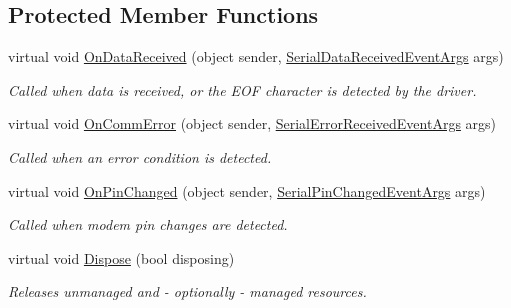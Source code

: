 \subsection*{Protected Member Functions}
\begin{DoxyCompactItemize}
\item 
virtual void \mbox{\hyperlink{class_r_j_c_p_1_1_i_o_1_1_ports_1_1_native_1_1_win_native_serial_ac927fc2e62ce46556e64761ca84c14d2}{On\+Data\+Received}} (object sender, \mbox{\hyperlink{class_r_j_c_p_1_1_i_o_1_1_ports_1_1_serial_data_received_event_args}{Serial\+Data\+Received\+Event\+Args}} args)
\begin{DoxyCompactList}\small\item\em Called when data is received, or the E\+OF character is detected by the driver. \end{DoxyCompactList}\item 
virtual void \mbox{\hyperlink{class_r_j_c_p_1_1_i_o_1_1_ports_1_1_native_1_1_win_native_serial_ac40ba5f302e120f59c241c05b26aaf68}{On\+Comm\+Error}} (object sender, \mbox{\hyperlink{class_r_j_c_p_1_1_i_o_1_1_ports_1_1_serial_error_received_event_args}{Serial\+Error\+Received\+Event\+Args}} args)
\begin{DoxyCompactList}\small\item\em Called when an error condition is detected. \end{DoxyCompactList}\item 
virtual void \mbox{\hyperlink{class_r_j_c_p_1_1_i_o_1_1_ports_1_1_native_1_1_win_native_serial_a2ab6155ff7c5c31143a3f7fba479057b}{On\+Pin\+Changed}} (object sender, \mbox{\hyperlink{class_r_j_c_p_1_1_i_o_1_1_ports_1_1_serial_pin_changed_event_args}{Serial\+Pin\+Changed\+Event\+Args}} args)
\begin{DoxyCompactList}\small\item\em Called when modem pin changes are detected. \end{DoxyCompactList}\item 
virtual void \mbox{\hyperlink{class_r_j_c_p_1_1_i_o_1_1_ports_1_1_native_1_1_win_native_serial_aff7fb25de681a40096de254df90aae88}{Dispose}} (bool disposing)
\begin{DoxyCompactList}\small\item\em Releases unmanaged and -\/ optionally -\/ managed resources. \end{DoxyCompactList}\end{DoxyCompactItemize}
